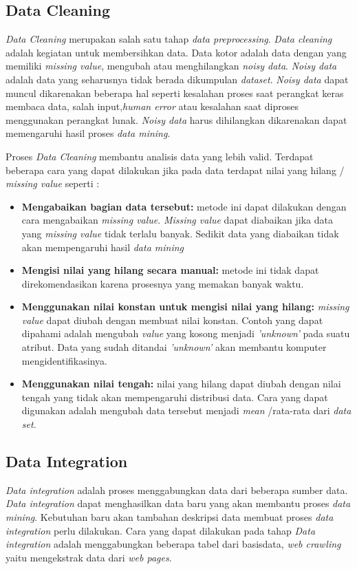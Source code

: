 \subsection{Data Cleaning}
\label{chap:datacleaning}
\textit{Data Cleaning} merupakan salah satu tahap \textit{data preprocessing}. \textit{Data cleaning} adalah kegiatan untuk membersihkan data. Data kotor adalah data dengan yang memiliki \textit{missing value}, mengubah atau menghilangkan \textit{noisy data}. \textit{Noisy data} adalah data yang seharusnya tidak berada dikumpulan \textit{dataset}. \textit{Noisy data} dapat muncul dikarenakan beberapa hal seperti kesalahan proses saat perangkat keras membaca data, salah input,\textit{human error} atau kesalahan saat diproses menggunakan perangkat lunak. \textit{Noisy data} harus dihilangkan dikarenakan dapat memengaruhi hasil proses \textit{data mining}.

 Proses \textit{Data Cleaning} membantu analisis data yang lebih valid. Terdapat beberapa cara yang dapat dilakukan jika pada data terdapat nilai yang hilang / \textit{missing value} seperti :

\begin{itemize}
\item \textbf{Mengabaikan bagian data tersebut:} metode ini dapat dilakukan dengan cara mengabaikan \textit{missing value}. \textit{Missing value} dapat diabaikan jika data yang \textit{missing value} tidak terlalu banyak. Sedikit data yang diabaikan tidak akan mempengaruhi hasil \textit{data mining}
\item \textbf{Mengisi nilai yang hilang secara manual:} metode ini tidak dapat direkomendasikan karena prosesnya yang memakan banyak waktu.
\item \textbf{Menggunakan nilai konstan untuk mengisi nilai yang hilang:} \textit{missing value} dapat diubah dengan membuat nilai konstan. Contoh yang dapat dipahami adalah mengubah \textit{value} yang kosong menjadi \textit{'unknown'} pada suatu atribut. Data yang sudah ditandai \textit{'unknown'} akan membantu komputer mengidentifikasinya. 
\item \textbf{Menggunakan nilai tengah:} nilai yang hilang dapat diubah dengan nilai tengah yang tidak akan mempengaruhi distribusi data. Cara yang dapat digunakan adalah mengubah data tersebut menjadi \textit{mean} /rata-rata  dari \textit{data set}.
\end{itemize}


\subsection{Data Integration} 
\label{chap:dataintegration}
\textit{Data integration} adalah proses menggabungkan data dari beberapa sumber data. \textit{Data integration} dapat menghasilkan data baru yang akan membantu proses \textit{data mining}. Kebutuhan baru akan tambahan deskripsi data membuat proses \textit{data integration} perlu dilakukan. Cara yang dapat dilakukan pada tahap \textit{Data integration} adalah menggabungkan beberapa tabel dari basisdata, \textit{web crawling} yaitu mengekstrak data dari \textit{web pages}. 



